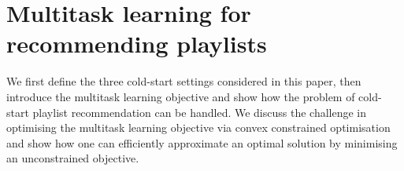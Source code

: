 \section{Multitask learning for recommending playlists}
\label{sec:method}




We first define the three cold-start settings considered in this paper,
then introduce the multitask learning objective 
and show how the problem of cold-start playlist recommendation can be handled.
We discuss the challenge in optimising the multitask learning objective
via convex constrained optimisation
and show how one can efficiently approximate an optimal solution by minimising
an unconstrained objective.


